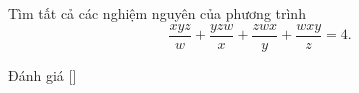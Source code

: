 \ifshowproblem
\begin{problem}\label{problem:CHN-2015-NMO-10-P1}
    Tìm tất cả các nghiệm nguyên của phương trình \[ \frac{xyz}{w}+\frac{yzw}{x}+\frac{zwx}{y}+\frac{wxy}{z}=4. \]
\end{problem}
\fi

\ifshowinfo
Đánh giá [\textbf{}]\footnotemark
{}
\fi